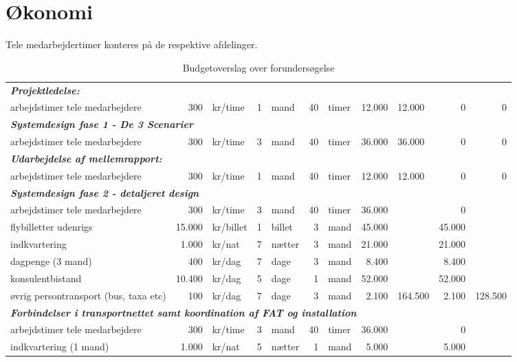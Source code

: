 \documentclass[11pt,a4paper]{article}
\begin{document}
\section{Økonomi}
Tele medarbejdertimer konteres på de respektive afdelinger.
\begin{table}[htbp]
\centering
\caption{Budgetoverslag over forundersøgelse}
\begin{tabular}{lrlrlrlrlrr}
\multicolumn{11}{l}{\textit{\textbf{Projektledelse:}}}\\
arbejdstimer tele medarbejdere & 300 & kr/time & 1 & mand & 40 & timer & 12.000 & 12.000 & 0 & 0\\
\multicolumn{11}{l}{\textit{\textbf{Systemdesign fase 1 - De 3 Scenarier}}}\\
arbejdstimer tele medarbejdere & 300   & kr/time & 3     & mand  & 40    & timer & 36.000 & 36.000 & 0     & 0\\
\multicolumn{11}{l}{\textit{\textbf{Udarbejdelse af mellemrapport:}}}\\
arbejdstimer tele medarbejdere & 300   & kr/time & 1     & mand  & 40    & timer & 12.000 & 12.000 & 0     & 0\\
\multicolumn{11}{l}{\textit{\textbf{Systemdesign fase 2 - detaljeret design}}}\\
arbejdstimer tele medarbejdere & 300   & kr/time & 3     & mand  & 40    & timer & 36.000 &       & 0     &\\
flybilletter udenrigs & 15.000 & kr/billet & 1     & billet & 3     & mand  & 45.000 &       & 45.000 &\\
indkvartering & 1.000 & kr/nat & 7     & nætter & 3     & mand  & 21.000 &       & 21.000 &\\
dagpenge (3 mand) & 400   & kr/dag & 7     & dage  & 3     & mand  & 8.400 &       & 8.400 &\\
konsulentbistand & 10.400 & kr/dag & 5     & dage  & 1     & mand  & 52.000 &       & 52.000 &\\
øvrig persontransport (bus, taxa etc) & 100   & kr/dag & 7 & dage  & 3     & mand  & 2.100 & 164.500 & 2.100 & 128.500\\
\multicolumn{11}{l}{\textit{\textbf{Forbindelser i transportnettet samt koordination af FAT og installation}}}\\
arbejdstimer tele medarbejdere & 300   & kr/time & 3     & mand  & 40    & timer & 36.000 &       & 0     &\\
indkvartering (1 mand) & 1.000 & kr/nat & 5     & nætter & 1     & mand  & 5.000 &       & 5.000 &\\

\end{tabular}
\end{table}
\end{document}
